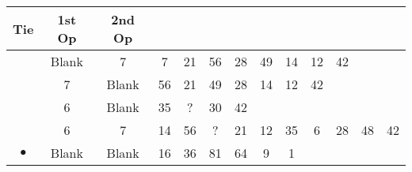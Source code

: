 \begin{table}\begin{tabular}{ccc|cccccccccc}
Tie&1st Op&2nd Op&&&&&&&&&&\\
\hline
&Blank&7&7&21&56&28&49&14&12&42\\
&7&Blank&56&21&49&28&14&12&42\\
&6&Blank&35&?&30&42\\
&6&7&14&56&?&21&12&35&6&28&48&42\\
$\bullet$&Blank&Blank&16&36&81&64&9&1\\
\end{tabular}\end{table}
